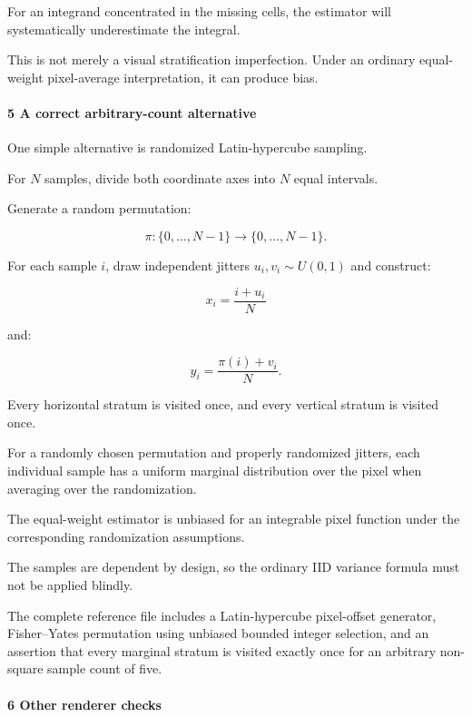 For an integrand concentrated in the missing cells, the estimator will systematically underestimate the integral.

This is not merely a visual stratification imperfection. Under an ordinary equal-weight pixel-average interpretation, it can produce bias.

\paragraph{5 A correct arbitrary-count alternative}\label{02-foundations-ii-ch039-a-correct-arbitrary-count-alternative}

\hypertarget{02-foundations-ii-ch039-a-correct-arbitrary-count-alternative}{}

One simple alternative is randomized Latin-hypercube sampling.

For \(N\) samples, divide both coordinate axes into \(N\) equal intervals.

Generate a random permutation:

\[
 \pi:\{0,\ldots,N-1\}\rightarrow\{0,\ldots,N-1\}.
\]

For each sample \(i\), draw independent jitters \(u_i,v_i\sim U(0,1)\) and construct:

\[
 \boxed{ x_i=\frac{i+u_i}{N} }
\]

and:

\[
 \boxed{ y_i=\frac{\pi(i)+v_i}{N} }.
\]

Every horizontal stratum is visited once, and every vertical stratum is visited once.

For a randomly chosen permutation and properly randomized jitters, each individual sample has a uniform marginal distribution over the pixel when averaging over the randomization.

The equal-weight estimator is unbiased for an integrable pixel function under the corresponding randomization assumptions.

The samples are dependent by design, so the ordinary IID variance formula must not be applied blindly.

The complete reference file includes a Latin-hypercube pixel-offset generator, Fisher--Yates permutation using unbiased bounded integer selection, and an assertion that every marginal stratum is visited exactly once for an arbitrary non-square sample count of five.

\paragraph{6 Other renderer checks}\label{02-foundations-ii-ch039-other-renderer-checks}


